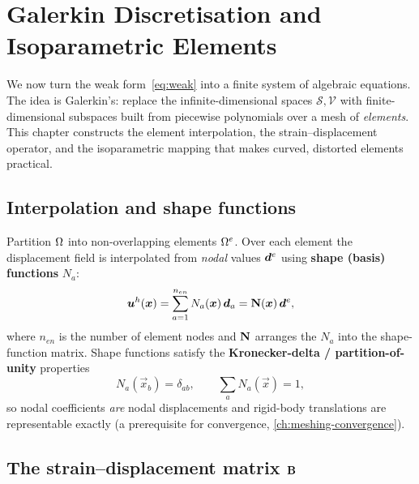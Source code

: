 \chapter{Galerkin Discretisation and Isoparametric Elements}
\label{ch:discretization}

We now turn the weak form~\eqref{eq:weak} into a finite system of
algebraic equations. The idea is Galerkin's: replace the
infinite-dimensional spaces $\mathcal S,\mathcal V$ with
finite-dimensional subspaces built from piecewise polynomials over a
mesh of \emph{elements}. This chapter constructs the element
interpolation, the strain--displacement operator, and the isoparametric
mapping that makes curved, distorted elements practical.

\section{Interpolation and shape functions}

Partition $\Omega$ into non-overlapping elements $\Omega^e$. Over each
element the displacement field is interpolated from \emph{nodal} values
$\bm{d}^{e}$ using \textbf{shape (basis) functions} $N_a$:
\begin{equation}
  \bm{u}^h(\bm{x}) = \sum_{a=1}^{n_{en}} N_a(\bm{x})\,\bm{d}_a
                  = \mathbf{N}(\bm{x})\,\bm{d}^{e} ,
  \label{eq:interp}
\end{equation}
where $n_{en}$ is the number of element nodes and $\mathbf{N}$ arranges the
$N_a$ into the shape-function matrix. Shape functions satisfy the
\textbf{Kronecker-delta / partition-of-unity} properties
\begin{equation}
  N_a(\vec x_b)=\delta_{ab}, \qquad \sum_a N_a(\vec x)=1,
\end{equation}
so nodal coefficients \emph{are} nodal displacements and rigid-body
translations are representable exactly (a prerequisite for convergence,
\cref{ch:meshing-convergence}).

\section{The strain--displacement matrix \texorpdfstring{$\mathbf{B}$}{B}}

